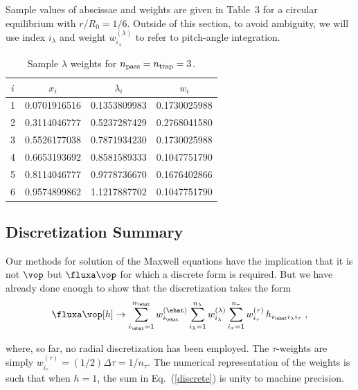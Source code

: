 Sample values of abscissae and 
weights are given in Table~3
for a circular equilibrium with $r/R_0 = 1/6$.  Outside of 
this section, to avoid ambiguity, we will use index $i_\lambda$ 
and weight $w^{(\lambda)}_{i_\lambda}$ to refer to pitch-angle 
integration.

\begin{table}
\begin{center}
\begin{tabular}{|c|c|c|c|} \hline
$i$ & $x_i$ & $\lambda_i$ & $w_i$ \\ \hline\hline
 1&  0.0701916516&  0.1353809983& 0.1730025988 \\
 2&  0.3114046777&  0.5237287429& 0.2768041580 \\
 3&  0.5526177038&  0.7871934230& 0.1730025988 \\
 4&  0.6653193692&  0.8581589333& 0.1047751790 \\
 5&  0.8114046777&  0.9778736670& 0.1676402866 \\
 6&  0.9574899862&  1.1217887702& 0.1047751790 \\ \hline
\end{tabular}
\caption{Sample $\lambda$ weights for 
$n_{\rm pass} = n_{\rm trap} = 3$.}
\label{tab.pitch}
\end{center}
\end{table}

\subsection{Discretization Summary}

Our methods for solution of the Maxwell equations have the 
implication that it is not $\vop$ but $\fluxa\vop$ for 
which a discrete form is required.  But we have already 
done enough to show that the discretization takes the form
%
\begin{equation}
\fluxa\vop[h] \rightarrow 
\sum_{i_\ehat = 1}^{n_\ehat} w_{i_\ehat}^{(\ehat)}
\sum_{i_\lambda = 1}^{n_\lambda} w_{i_\lambda}^{(\lambda)}
\sum_{i_\tau = 1}^{n_\tau} w_{i_\tau}^{(\tau)} \, 
  h_{i_\ehat i_\lambda i_\tau} \; ,
\label{discrete}
\end{equation}

\noindent
where, so far, no radial discretization has been employed.
The $\tau$-weights are simply 
$w_{i_\tau}^{(\tau)} = (1/2) \Delta\tau = 1/n_\tau$.
The numerical representation of the weights is such that 
when $h=1$, the sum in Eq.~(\ref{discrete}) is unity to 
machine precision. 

